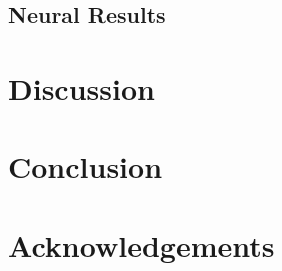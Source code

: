\documentclass[11pt]{article}
\begin{document}
\subsection{Neural Results}


\section{Discussion}


\section{Conclusion}


\section*{Acknowledgements}







\end{document}
